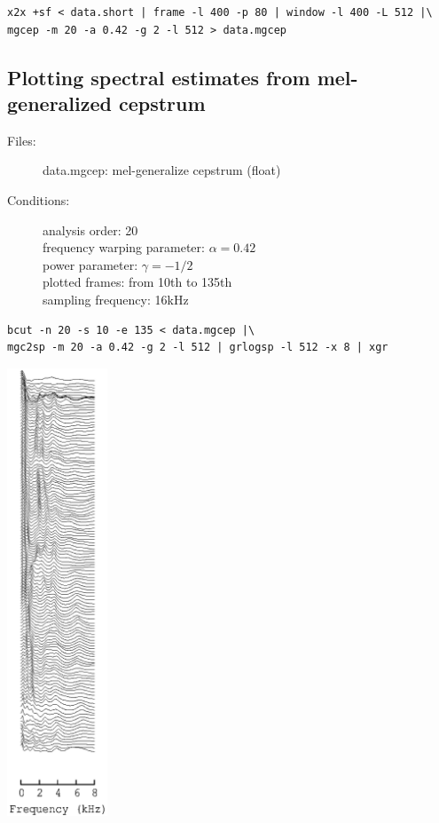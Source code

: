 \documentclass[a4paper]{article}
\begin{document}
\begin{verbatim}
x2x +sf < data.short | frame -l 400 -p 80 | window -l 400 -L 512 |\
mgcep -m 20 -a 0.42 -g 2 -l 512 > data.mgcep
\end{verbatim}

\subsection{Plotting spectral estimates from mel-generalized cepstrum}

\begin{description}
\item[Files:]
  data.mgcep: mel-generalize cepstrum (float)
\item[Conditions:]
  analysis order: 20\\
  frequency warping parameter: $\alpha = 0.42$\\
  power parameter: $\gamma = -1/2$\\
  plotted frames: from 10th to 135th\\
  sampling frequency: 16kHz
\end{description}

\begin{verbatim}
bcut -n 20 -s 10 -e 135 < data.mgcep |\
mgc2sp -m 20 -a 0.42 -g 2 -l 512 | grlogsp -l 512 -x 8 | xgr
\end{verbatim}

\includegraphics[width=3cm]{data.mgcep.grlogsp.eps}
\end{document}

